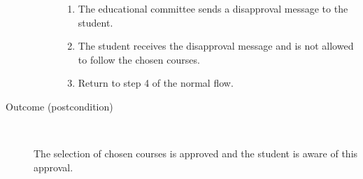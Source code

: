 \begin{description}
\begin{description}
\begin{enumerate}
		 	\item The educational committee sends a disapproval message to the student.
		 	\item The student receives the disapproval message and is not allowed to
		 	follow the chosen courses.
		 	\item Return to step 4 of the normal flow.
		\end{enumerate}
	\end{description}
	\item[Outcome (postcondition)] \ 
		\par The selection of chosen courses is approved and the student is aware of
		this approval.
\end{description}
